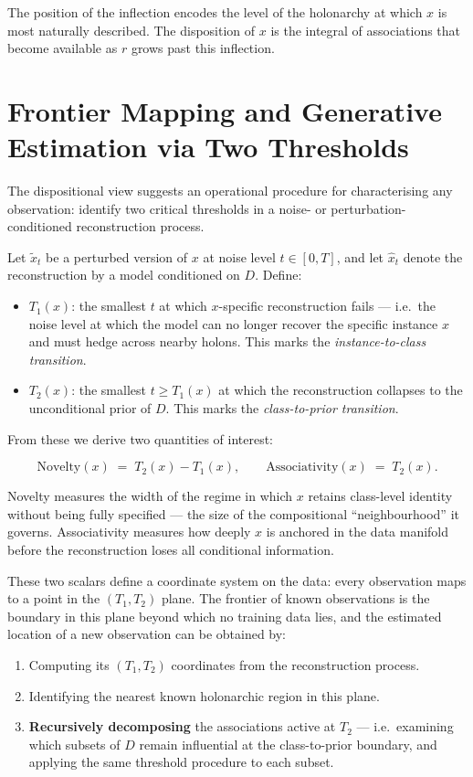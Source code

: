 \documentclass[11pt,a4paper]{article}
\begin{document}
The position of the inflection encodes the level of the holonarchy at which $x$ is most
naturally described. The disposition of $x$ is the integral of associations that become
available as $r$ grows past this inflection.

\section{Frontier Mapping and Generative Estimation via Two Thresholds}

The dispositional view suggests an operational procedure for characterising any
observation: identify two critical thresholds in a noise- or perturbation-conditioned
reconstruction process.

Let $\tilde{x}_t$ be a perturbed version of $x$ at noise level $t \in [0, T]$, and let
$\hat{x}_t$ denote the reconstruction by a model conditioned on $D$. Define:

\begin{itemize}
  \item $T_1(x)$: the smallest $t$ at which $x$-specific reconstruction fails ---
        i.e.\ the noise level at which the model can no longer recover the specific
        instance $x$ and must hedge across nearby holons. This marks the
        \emph{instance-to-class transition}.
  \item $T_2(x)$: the smallest $t \geq T_1(x)$ at which the reconstruction collapses to
        the unconditional prior of $D$. This marks the \emph{class-to-prior transition}.
\end{itemize}

From these we derive two quantities of interest:

\[
  \text{Novelty}(x) \;=\; T_2(x) - T_1(x), \qquad
  \text{Associativity}(x) \;=\; T_2(x).
\]

Novelty measures the width of the regime in which $x$ retains class-level identity
without being fully specified --- the size of the compositional ``neighbourhood'' it
governs. Associativity measures how deeply $x$ is anchored in the data manifold before
the reconstruction loses all conditional information.

These two scalars define a coordinate system on the data: every observation maps to a
point in the $(T_1, T_2)$ plane. The frontier of known observations is the boundary in
this plane beyond which no training data lies, and the estimated location of a new
observation can be obtained by:

\begin{enumerate}
  \item Computing its $(T_1, T_2)$ coordinates from the reconstruction process.
  \item Identifying the nearest known holonarchic region in this plane.
  \item \textbf{Recursively decomposing} the associations active at $T_2$ ---
        i.e.\ examining which subsets of $D$ remain influential at the class-to-prior
        boundary, and applying the same threshold procedure to each subset.
\end{enumerate}
\end{document}
